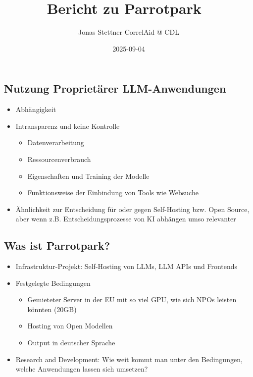 \documentclass[
  letterpaper,
  DIV=11,
  numbers=noendperiod]{scrartcl}
\title{Bericht zu Parrotpark 🦜}
\author{Jonas Stettner \textbar{} CorrelAid @ CDL}
\date{2025-09-04}
\providecommand{\tightlist}{%
  \setlength{\itemsep}{0pt}\setlength{\parskip}{0pt}}\usepackage{longtable,booktabs,array}
\begin{document}
\maketitle


\subsection{Nutzung Proprietärer
LLM-Anwendungen}\label{nutzung-proprietuxe4rer-llm-anwendungen}

\begin{itemize}
\tightlist
\item
  Abhängigkeit
\item
  Intransparenz und keine Kontrolle

  \begin{itemize}
  \tightlist
  \item
    Datenverarbeitung
  \item
    Ressourcenverbrauch
  \item
    Eigenschaften und Training der Modelle
  \item
    Funktionsweise der Einbindung von Tools wie Websuche
  \end{itemize}
\item
  Ähnlichkeit zur Entscheidung für oder gegen Self-Hosting bzw. Open
  Source, aber wenn z.B. Entscheidungsprozesse von KI abhängen umso
  relevanter
\end{itemize}

\subsection{Was ist Parrotpark? 🦜}\label{was-ist-parrotpark}

\begin{itemize}
\tightlist
\item
  Infrastruktur-Projekt: Self-Hosting von LLMs, LLM APIs und Frontends
\item
  Festgelegte Bedingungen

  \begin{itemize}
  \tightlist
  \item
    Gemieteter Server in der EU mit so viel GPU, wie sich NPOs leisten
    könnten (20GB)
  \item
    Hosting von Open Modellen
  \item
    Output in deutscher Sprache
  \end{itemize}
\item
  Research and Development: Wie weit kommt man unter den Bedingungen,
  welche Anwendungen lassen sich umsetzen?
\end{itemize}
\end{document}
